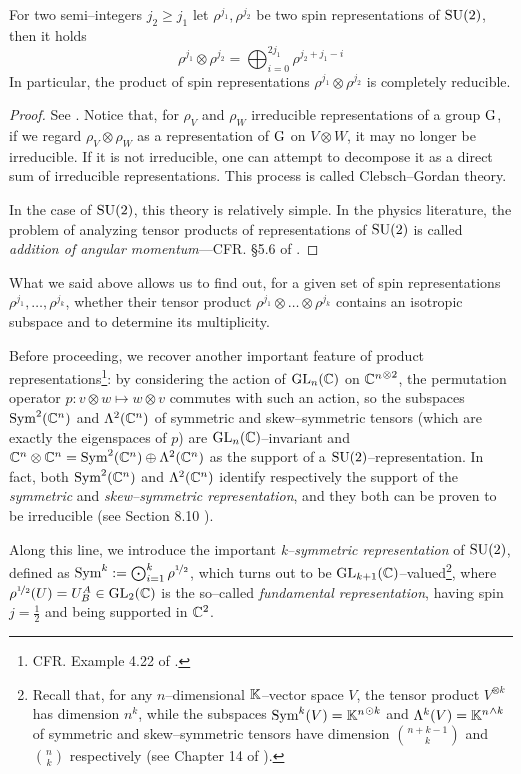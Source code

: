 \begin{teo}\label{glebsh}
For two semi--integers $j_2\geq j_1$ let $\rho^{j_1},\rho^{j_2}$ be two spin representations of $\text{\normalfont SU}(2)$, then it holds
$$\rho^{j_1}\otimes\rho^{j_2}=\bigoplus_{i=0}^{2j_1}\rho^{j_2+j_1-i}$$
In particular, the product of spin representations $\rho^{j_1}\otimes\rho^{j_2}$ is completely reducible.
\end{teo}
\begin{proof}
    See \cite{LN6}. Notice that, for $\rho_V$ and $\rho_W$ irreducible representations of a group $\text{\normalfont G}$, if we regard $\rho_V\otimes\rho_W$ as a representation of $\text{\normalfont G}$ on $V\otimes W$, it may no longer be irreducible. If it is not irreducible, one can attempt to decompose it as a direct sum of irreducible representations. This process is called Clebsch--Gordan theory. 
    
    In the case of $\text{\normalfont SU}(2)$, this theory is relatively simple. In the physics literature, the problem of analyzing tensor products of representations of $\text{\normalfont SU}(2)$ is called \emph{addition of angular momentum}---CFR. §5.6 of \cite{hall}. 
\end{proof}

What we said above allows us to find out, for a given set of spin representations $\rho^{j_1},\hdots,\rho^{j_k}$, whether their tensor product $\rho^{j_1}\otimes\hdots\otimes\rho^{j_k}$ contains an isotropic subspace and to determine its multiplicity.

{Before proceeding, we recover another important feature of product representations\footnote{CFR. Example 4.22 of \cite{kirillov}.}: by considering the action of $\text{\normalfont GL}_n(\mathbb{C})$ on ${\mathbb{C}^n}^{\otimes 2}$, the permutation operator $p:v\otimes w\mapsto w\otimes v$ commutes with such an action, so the subspaces $\text{\normalfont Sym}^2(\mathbb{C}^n)$ and $\Lambda^2(\mathbb{C}^n)$ of symmetric and skew--symmetric tensors (which are exactly the eigenspaces of $p$) are $\text{\normalfont GL}_n(\mathbb{C})$--invariant and $\mathbb{C}^n\otimes\mathbb{C}^n=\text{\normalfont Sym}^2(\mathbb{C}^n)\oplus\Lambda^2(\mathbb{C}^n)$ as the support of a $\text{\normalfont SU}(2)$--representation. In fact, both $\text{\normalfont Sym}^2(\mathbb{C}^n)$ and $\Lambda^2(\mathbb{C}^n)$ identify respectively the support of the \emph{symmetric} and \emph{skew--symmetric representation}, and they both can be proven to be irreducible (see Section 8.10 \cite{kirillov}). }

{Along this line, we introduce the important \emph{k--symmetric representation} of $\text{\normalfont SU}(2)$, defined as $\text{\normalfont Sym}^k:=\bigodot_{i=1}^k\rho^{\nicefrac{1}{2}}$, which turns out to be $\text{\normalfont GL}_{k+1}(\mathbb{C})$--valued\footnote{{Recall that, for any $n$--dimensional $\mathbb{K}$--vector space $V$, the tensor product $V^{\otimes k}$ has dimension $n^k$, while the subspaces $\text{\normalfont Sym}^k(V)={\mathbb{K}^n}^{\odot k}$ and $\Lambda^k(V)={\mathbb{K}^n}^{\wedge k}$ of symmetric and skew--symmetric tensors have dimension $\binom{n+k-1}{k}$ and $\binom{n}{k}$ respectively (see Chapter 14 of \cite{lee_smooth}).}}, where $\rho^{\nicefrac{1}{2}}(U)=U^A_B\in\text{\normalfont GL}_2(\mathbb{C})$ is the so--called \emph{fundamental representation}, having spin $j=\frac{1}{2}$ and being supported in $\mathbb{C}^2$. }

